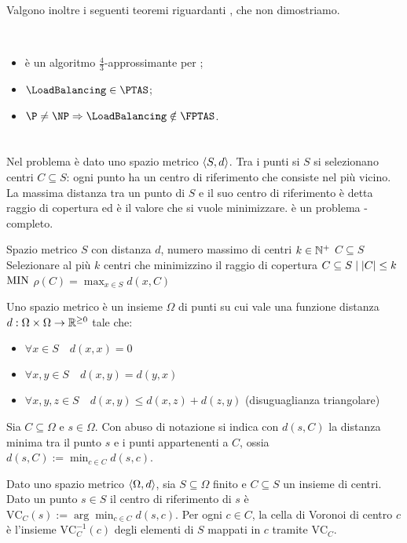Valgono inoltre i seguenti teoremi riguardanti \LoadBalancing, che non dimostriamo.
\begin{theorem}~
	\begin{itemize}
		\item \SortedGreedyBalance è un algoritmo $\frac43$-approssimante per \LoadBalancing \cite{Graham:69:sortedgreedybalance};
		\item $\LoadBalancing\in\PTAS$;
		\item $\P\neq\NP\impl\LoadBalancing\notin\FPTAS$.
	\end{itemize}
\end{theorem}



\section{\CenterSelection}
Nel problema \CenterSelection è dato uno spazio metrico $\langle S,d \rangle$.
Tra i punti si $S$ si selezionano centri $C\subseteq S$: ogni punto ha un centro di riferimento che consiste nel più vicino.
La massima distanza tra un punto di $S$ e il suo centro di riferimento è detta raggio di copertura ed è il valore che si vuole minimizzare.
\CenterSelection è un problema \NPO-completo.

\popt{\CenterSelection}
{Spazio metrico $S$ con distanza $d$, numero massimo di centri $k\in\mathbb N^+$}
{$C\subseteq S$}
{Selezionare al più $k$ centri che minimizzino il raggio di copertura}
{$C\subseteq S\mid | C |\leq k$}
{$\mathrm{MIN}$}
{$\rho(C) = \max_{x \in S} d(x, C)$}

Uno spazio metrico è un insieme $\Omega$ di punti su cui vale una funzione distanza $d:\Omega\times\Omega\to\mathbb R^{\geq0}$ tale che:
\begin{itemize}
	\item $\forall x\in S\quad d(x,x)=0$
	\item $\forall x,y\in S\quad d(x,y)=d(y,x)$
	\item $\forall x,y,z\in S\quad d(x,y)\leq d(x,z)+d(z,y)$ (disuguaglianza triangolare)
\end{itemize}
Sia $C\subseteq\Omega$ e $s\in\Omega$. Con abuso di notazione si indica con $d(s,C)$ la distanza minima tra il punto $s$ e i punti appartenenti a $C$, ossia $d(s,C):=\min_{c\in C} d(s,c)$.

\begin{defin}
	Dato uno spazio metrico $\langle \Omega,d \rangle$, sia $S\subseteq\Omega$ finito e $C\subseteq S$ un insieme di centri.
	Dato un punto $s\in S$ il centro di riferimento di $s$ è $\text{VC}_C(s):=\arg\min_{c\in C} d(s,c)$.
	Per ogni $c\in C$, la cella di Voronoi di centro $c$ è l'insieme $\text{VC}_C^{-1}(c)$ degli elementi di $S$ mappati in $c$ tramite $\text{VC}_C$.
\end{defin}

